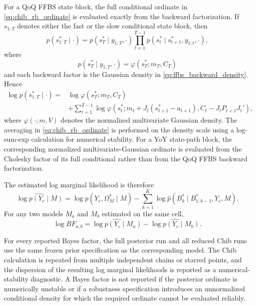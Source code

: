 \documentclass[11pt]{article}
\begin{document}
For a QoQ FFBS state block, the full conditional ordinate in \cref{eq:chib_rb_ordinate} is evaluated exactly from the backward factorization. If \(s_{1:T}\) denotes either the fast or the slow conditional state block, then
\begin{equation}
p(s_{1:T}^{\ast}\mid\cdot)
=
p(s_T^{\ast}\mid y_{1:T},\cdot)
\prod_{t=1}^{T-1}
p(s_t^{\ast}\mid s_{t+1}^{\ast},y_{1:t},\cdot),
\label{eq:ffbs_path_ordinate}
\end{equation}
where
\begin{equation}
p(s_T^{\ast}\mid y_{1:T},\cdot)
=
\varphi(s_T^{\ast};m_T,C_T)
\end{equation}
and each backward factor is the Gaussian density in \cref{eq:ffbs_backward_density}. Hence
\begin{align}
\log p(s_{1:T}^{\ast}\mid\cdot)
={}&
\log\varphi(s_T^{\ast};m_T,C_T)\\
&+
\sum_{t=1}^{T-1}
\log\varphi
\left(
s_t^{\ast};
 m_t+J_t(s_{t+1}^{\ast}-a_{t+1}),
 C_t-J_tP_{t+1}J_t'
\right),
\end{align}
where \(\varphi(\cdot;m,V)\) denotes the normalized multivariate Gaussian density. The averaging in \cref{eq:chib_rb_ordinate} is performed on the density scale using a log-sum-exp calculation for numerical stability. For a YoY state-path block, the corresponding normalized multivariate-Gaussian ordinate is evaluated from the Cholesky factor of its full conditional rather than from the QoQ FFBS backward factorization.

The estimated log marginal likelihood is therefore
\begin{equation}
\widehat{\log p(Y_c\mid M)}
=
\log p(Y_c,\Omega_M^{\ast}\mid M)
-
\sum_{k=1}^{K}
\log
\widehat p(B_k^{\ast}\mid B_{1:k-1}^{\ast},Y_c,M).
\label{eq:chib_log_ml}
\end{equation}
For any two models \(M_a\) and \(M_b\) estimated on the same cell,
\begin{equation}
\log BF_{a,b}
=
\widehat{\log p(Y_c\mid M_a)}
-
\widehat{\log p(Y_c\mid M_b)}.
\label{eq:log_bayes_factor}
\end{equation}

For every reported Bayes factor, the full posterior run and all reduced Chib runs use the same frozen prior specification as the corresponding model. The Chib calculation is repeated from multiple independent chains or starred points, and the dispersion of the resulting log marginal likelihoods is reported as a numerical-stability diagnostic. A Bayes factor is not reported if the posterior ordinate is numerically unstable or if a robustness specification introduces an unnormalized conditional density for which the required ordinate cannot be evaluated reliably.
\end{document}
